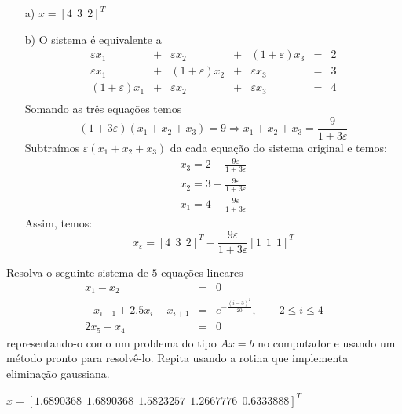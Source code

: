 \begin{resp}
\begin{itemize}
\item[a)] $x=[4 ~~3 ~~2]^T$
\item[b)] O sistema é equivalente a
\begin{equation}
\begin{array}{lclclcl}
\varepsilon x_1 &+& \varepsilon x_2 &+&(1+\varepsilon) x_3 &=& 2\\
\varepsilon x_1 &+& (1+\varepsilon) x_2 &+&\varepsilon x_3 &=& 3\\
(1+\varepsilon) x_1 &+& \varepsilon x_2 &+&\varepsilon x_3 &=& 4\\
\end{array}
\end{equation}
Somando as três equações temos
\begin{equation} (1+3\varepsilon)(x_1+x_2+x_3)=9\Longrightarrow x_1+x_2+x_3=\frac{9}{1+3\varepsilon} \end{equation}
Subtraímos $\varepsilon(x_1+x_2+x_3)$ da cada equação do sistema original e temos:
\begin{equation}\begin{array}{l}
x_3=2-\frac{9\varepsilon}{1+3\varepsilon}\\
x_2=3-\frac{9\varepsilon}{1+3\varepsilon}\\
x_1=4-\frac{9\varepsilon}{1+3\varepsilon}
\end{array}
\end{equation}
Assim, temos:
\begin{equation} x_{\varepsilon}=\left[4 ~~3 ~~2\right]^T-\frac{9\varepsilon}{1+3\varepsilon}\left[1 ~~1 ~~1\right]^T \end{equation}
\end{itemize}

\end{resp}


\begin{exer}\label{exer:trid} Resolva o seguinte sistema de $5$ equações lineares
\begin{eqnarray}
x_1-x_2&=&0\\
-x_{i-1}+2.5x_i-x_{i+1}&=&e^{-\frac{(i-3)^2}{20}},\qquad 2\leq i \leq 4\\
2x_{5}-x_{4}&=&0
\end{eqnarray}
representando-o como um problema do tipo $Ax=b$ no computador e usando um método pronto para resolvê-lo. Repita usando a rotina que implementa eliminação gaussiana.
\end{exer}
\begin{resp}
 $x=[ 1.6890368  ~~  1.6890368  ~~  1.5823257  ~~  1.2667776   ~~ 0.6333888]^{T}$
\end{resp}

